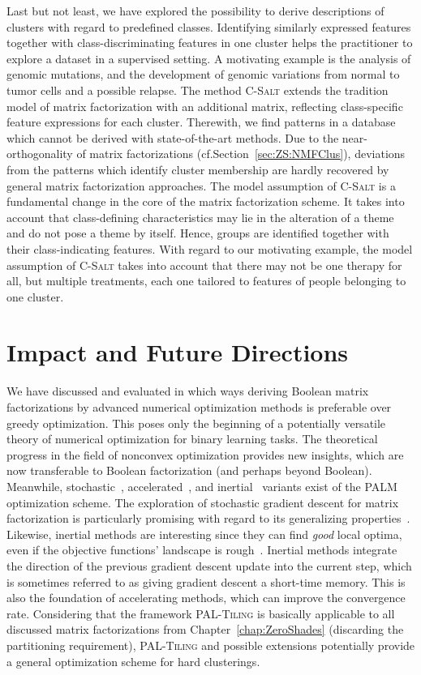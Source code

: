 Last but not least, we have explored the possibility to derive descriptions of clusters with regard to predefined classes. Identifying similarly expressed features together with class-discriminating features in one cluster helps the practitioner to explore a dataset in a supervised setting. A motivating example is the analysis of genomic mutations, and the development of genomic variations from normal to tumor cells and a possible relapse. The method \textsc{C-Salt} extends the tradition model of matrix factorization with an additional matrix, reflecting class-specific feature expressions for each cluster. Therewith, we find patterns in a database which cannot be derived with state-of-the-art methods. Due to the near-orthogonality of matrix factorizations (cf.\@ Section~\ref{sec:ZS:NMFClus}), deviations from the patterns which identify cluster membership are hardly recovered by general matrix factorization approaches. The model assumption of \textsc{C-Salt} is a fundamental change in the core of the matrix factorization scheme. It takes into account that class-defining characteristics may lie in the alteration of a theme and do not pose a theme by itself. Hence, groups are identified together with their class-indicating features. With regard to our motivating example, the model assumption of \textsc{C-Salt} takes into account that there may not be one therapy for all, but multiple treatments, each one tailored to features of people belonging to one cluster.
\section{Impact and Future Directions}
We have discussed and evaluated in which ways deriving Boolean matrix factorizations by advanced numerical optimization methods is preferable over greedy optimization. This poses only the beginning of a potentially versatile theory of numerical optimization for binary learning tasks. The theoretical progress in the field of nonconvex optimization provides new insights, which are now transferable to Boolean factorization (and perhaps beyond Boolean). Meanwhile, stochastic~\citep{davis2016sound}, accelerated~\citep{li2015accelerated}, and inertial~\citep{pock2016inertial} variants exist of the PALM optimization scheme. The exploration of stochastic gradient descent for matrix factorization is particularly promising with regard to its generalizing properties~\citep{hardt2016train,hoffer2017train}. Likewise, inertial methods are interesting since they can find \emph{good} local optima, even if the objective functions' landscape is rough~\citep{goh2017why}. Inertial methods integrate the direction of the previous gradient descent update into the current step, which is sometimes referred to as giving gradient descent a short-time memory. This is also the foundation of accelerating methods, which can improve the convergence rate. Considering that the framework \textsc{PAL-Tiling} is basically applicable to all discussed matrix factorizations from Chapter~\ref{chap:ZeroShades} (discarding the partitioning requirement), \textsc{PAL-Tiling} and possible extensions potentially provide a general optimization scheme for hard clusterings.   

